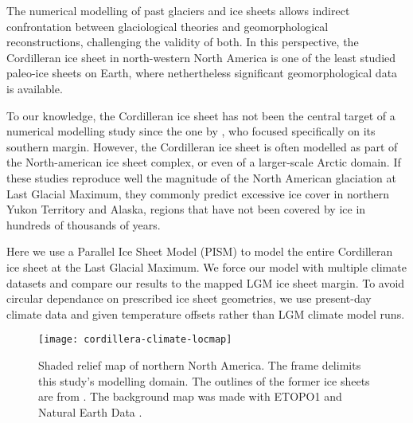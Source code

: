 
\introduction
\label{sec:intro}

The numerical modelling of past glaciers and ice sheets allows indirect confrontation between glaciological theories and geomorphological reconstructions, challenging the validity of both. In this perspective, the Cordilleran ice sheet in north-western North America is one of the least studied paleo-ice sheets on Earth, where nethertheless significant geomorphological data is available\needref.

To our knowledge, the Cordilleran ice sheet has not been the central target of a numerical modelling study since the one by \citep{roberts-1991}, who focused specifically on its southern margin. However, the Cordilleran ice sheet is often modelled as part of the North-american ice sheet complex\needref, or even of a larger-scale Arctic domain\needref. If these studies reproduce well the magnitude of the North American glaciation at Last Glacial Maximum, they commonly predict excessive ice cover in northern Yukon Territory and Alaska, regions that have not been covered by ice in hundreds of thousands of years\needref.

Here we use a Parallel Ice Sheet Model (PISM) to model the entire Cordilleran ice sheet at the Last Glacial Maximum. We force our model with multiple climate datasets and compare our results to the mapped LGM ice sheet margin. To avoid circular dependance on prescribed ice sheet geometries, we use present-day climate data and given temperature offsets rather than LGM climate model runs.

\begin{figure}[t]
	\vspace*{2mm}
	\begin{center}
		\texttt{[image: cordillera-climate-locmap]}
	\end{center}
	\caption{Shaded relief map of northern North America. The frame delimits this study's modelling domain. The outlines of the former ice sheets are from \citet{kleman-etal-2010}. The background map was made with ETOPO1 \citep{data:etopo1} and Natural Earth Data \citep{data:naturalearth}.}
	\label{fig:locmap}
\end{figure}

